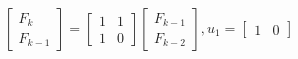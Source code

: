 \documentclass[preview]{standalone}
\begin{document}
\begin{center}
$$\begin{bmatrix} F_k \\ F_{k - 1} \end{bmatrix} = \begin{bmatrix} 1 & 1 \\ 1 & 0 \end{bmatrix} \begin{bmatrix} F_{k -1 } \\ F_{k - 2} \end{bmatrix}, u_1 = \begin{bmatrix} 1 & 0 \end{bmatrix}$$
\end{center}
\end{document}
